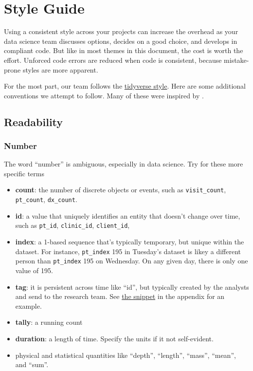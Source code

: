 \documentclass[
]{book}
\providecommand{\tightlist}{%
  \setlength{\itemsep}{0pt}\setlength{\parskip}{0pt}}
\begin{document}
\hypertarget{style}{%
\chapter{Style Guide}\label{style}}

Using a consistent style across your projects can increase the overhead as your data science team discusses options, decides on a good choice, and develops in compliant code. But like in most themes in this document, the cost is worth the effort. Unforced code errors are reduced when code is consistent, because mistake-prone styles are more apparent.

For the most part, our team follows the \href{https://style.tidyverse.org/}{tidyverse style}. Here are some additional conventions we attempt to follow. Many of these were inspired by \citep{balena-dimauro}.

\hypertarget{readability}{%
\section{Readability}\label{readability}}

\hypertarget{style-number}{%
\subsection{Number}\label{style-number}}

The word ``number'' is ambiguous, especially in data science. Try for these more specific terms

\begin{itemize}
\tightlist
\item
  \textbf{count}: the number of discrete objects or events, such as \texttt{visit\_count}, \texttt{pt\_count}, \texttt{dx\_count}.
\item
  \textbf{id}: a value that uniquely identifies an entity that doesn't change over time, such as \texttt{pt\_id}, \texttt{clinic\_id}, \texttt{client\_id},
\item
  \textbf{index}: a 1-based sequence that's typically temporary, but unique within the dataset. For instance, \texttt{pt\_index} 195 in Tuesday's dataset is likey a different person than \texttt{pt\_index} 195 on Wednesday. On any given day, there is only one value of 195.
\item
  \textbf{tag}: it is persistent across time like ``id'', but typically created by the analysts and send to the research team. See \protect\hyperlink{snippet-tag}{the snippet} in the appendix for an example.
\item
  \textbf{tally}: a running count
\item
  \textbf{duration}: a length of time. Specify the units if it not self-evident.
\item
  physical and statistical quantities like
  ``depth'',
  ``length'',
  ``mass'',
  ``mean'', and
  ``sum''.
\end{itemize}
\end{document}
